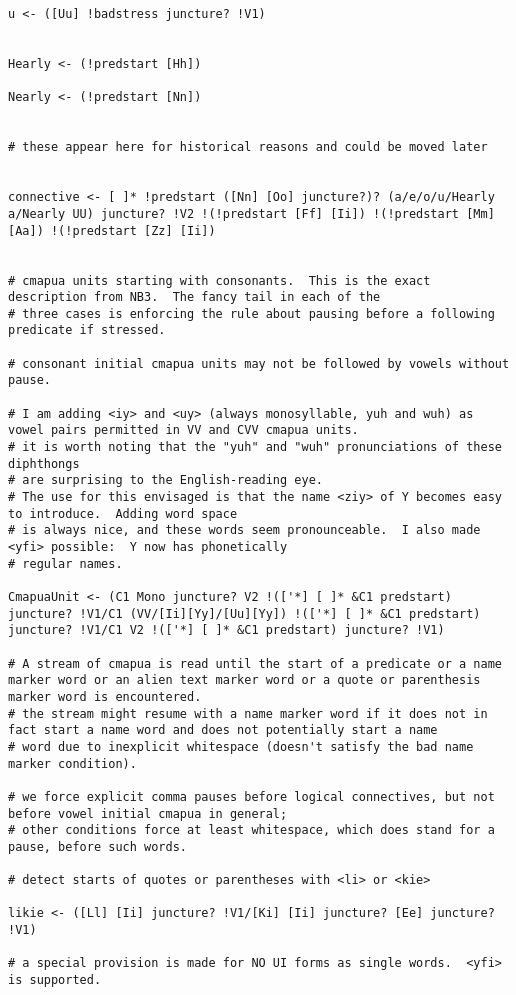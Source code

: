 \documentclass{article}
\begin{document}
\begin{verbatim}
u <- ([Uu] !badstress juncture? !V1)


Hearly <- (!predstart [Hh])

Nearly <- (!predstart [Nn])


# these appear here for historical reasons and could be moved later


connective <- [ ]* !predstart ([Nn] [Oo] juncture?)? (a/e/o/u/Hearly a/Nearly UU) juncture? !V2 !(!predstart [Ff] [Ii]) !(!predstart [Mm] [Aa]) !(!predstart [Zz] [Ii])


# cmapua units starting with consonants.  This is the exact description from NB3.  The fancy tail in each of the 
# three cases is enforcing the rule about pausing before a following predicate if stressed.

# consonant initial cmapua units may not be followed by vowels without pause.

# I am adding <iy> and <uy> (always monosyllable, yuh and wuh) as vowel pairs permitted in VV and CVV cmapua units.
# it is worth noting that the "yuh" and "wuh" pronunciations of these diphthongs
# are surprising to the English-reading eye.
# The use for this envisaged is that the name <ziy> of Y becomes easy to introduce.  Adding word space
# is always nice, and these words seem pronounceable.  I also made <yfi> possible:  Y now has phonetically
# regular names.

CmapuaUnit <- (C1 Mono juncture? V2 !(['*] [ ]* &C1 predstart) juncture? !V1/C1 (VV/[Ii][Yy]/[Uu][Yy]) !(['*] [ ]* &C1 predstart) juncture? !V1/C1 V2 !(['*] [ ]* &C1 predstart) juncture? !V1) 

# A stream of cmapua is read until the start of a predicate or a name marker word or an alien text marker word or a quote or parenthesis marker word is encountered.
# the stream might resume with a name marker word if it does not in fact start a name word and does not potentially start a name
# word due to inexplicit whitespace (doesn't satisfy the bad name marker condition).

# we force explicit comma pauses before logical connectives, but not before vowel initial cmapua in general;
# other conditions force at least whitespace, which does stand for a pause, before such words.

# detect starts of quotes or parentheses with <li> or <kie>

likie <- ([Ll] [Ii] juncture? !V1/[Ki] [Ii] juncture? [Ee] juncture? !V1)

# a special provision is made for NO UI forms as single words.  <yfi> is supported.


\end{verbatim}
\end{document}
